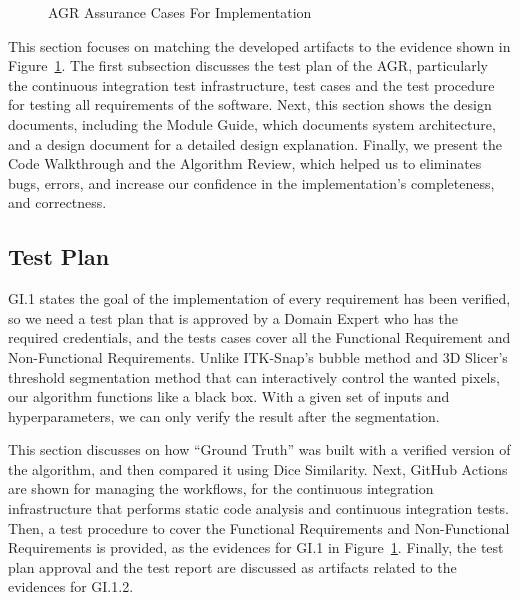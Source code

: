 \begin{figure}[hp]
    \centering
    \caption[AGR Assurance Cases For Implementation]{AGR Assurance Cases For Implementation}
    \label{fig_agr_ac_gi}
\end{figure}

This section focuses on matching the developed artifacts to the evidence shown in Figure~\ref{fig_agr_ac_gi}. The first subsection discusses the test plan of the AGR, particularly the continuous integration test infrastructure, test cases and the test procedure for testing all requirements of the software. Next, this section shows the design documents, including the Module Guide, which documents system architecture, and a design document for a detailed design explanation. Finally, we present the Code Walkthrough and the Algorithm Review, which helped us to eliminates bugs, errors, and increase our confidence in the implementation's completeness, and correctness.

\subsection{Test Plan}

GI.1 states the goal of the implementation of every requirement has been verified, so we need a test plan that is approved by a Domain Expert who has the required credentials,  and the tests cases cover all the Functional Requirement and Non-Functional Requirements. Unlike ITK-Snap's bubble method and 3D Slicer's threshold segmentation method that can interactively control the wanted pixels, our algorithm functions like a black box. With a given set of inputs and hyperparameters, we can only verify the result after the segmentation.

This section discusses on how ``Ground Truth'' was built with a verified version of the algorithm, and then compared it using Dice Similarity. Next, GitHub Actions are shown for managing the workflows, for the continuous integration infrastructure that performs static code analysis and continuous integration tests. Then, a test procedure to cover the Functional Requirements and Non-Functional Requirements is provided, as the evidences for GI.1 in Figure~\ref{fig_agr_ac_gi}. Finally, the test plan approval and the test report are discussed as artifacts related to the evidences for GI.1.2.

